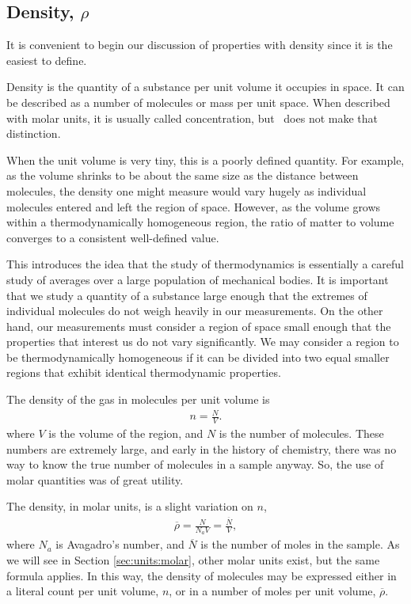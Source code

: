 \subsection{Density, $\rho$}

It is convenient to begin our discussion of properties with density since it is the easiest to define.

Density is the quantity of a substance per unit volume it occupies in space.  It can be described as a number of molecules or mass per unit space.  When described with molar units, it is usually called concentration, but \PM\ does not make that distinction.

When the unit volume is very tiny, this is a poorly defined quantity.  For example, as the volume shrinks to be about the same size as the distance between molecules, the density one might measure would vary hugely as individual molecules entered and left the region of space.  However, as the volume grows within a thermodynamically homogeneous region, the ratio of matter to volume converges to a consistent well-defined value.

This introduces the idea that the study of thermodynamics is essentially a careful study of averages over a large population of mechanical bodies.  It is important that we study a quantity of a substance large enough that the extremes of individual molecules do not weigh heavily in our measurements.  On the other hand, our measurements must consider a region of space small enough that the properties that interest us do not vary significantly.  We may consider a region to be thermodynamically homogeneous if it can be divided into two equal smaller regions that exhibit identical thermodynamic properties.

The density of the gas in molecules per unit volume is
\begin{align}
n = \frac{N}{V}.
\end{align}
where $V$ is the volume of the region, and $N$ is the number of molecules.  These numbers are extremely large, and early in the history of chemistry, there was no way to know the true number of molecules in a sample anyway.  So, the use of molar quantities was of great utility.

The density, in molar units, is a slight variation on $n$,
\begin{align}
\overline{\rho} = \frac{N}{N_a V} = \frac{\overline{N}}{V},
\end{align}
where $N_a$ is Avagadro's number, and $\overline{N}$ is the number of moles in the sample.  As we will see in Section \ref{sec:units:molar}, other molar units exist, but the same formula applies.  In this way, the density of molecules may be expressed either in a literal count per unit volume, $n$, or in a number of moles per unit volume, $\overline{\rho}$.


